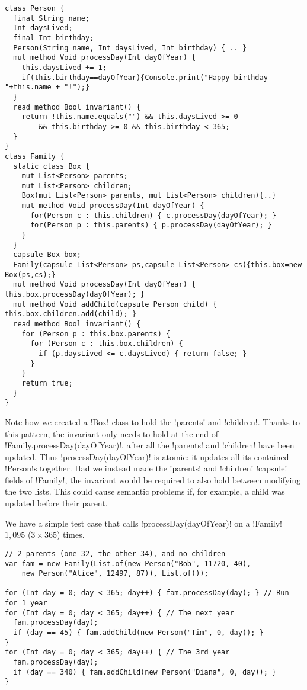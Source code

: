 \begin{lstlisting}
class Person { 
  final String name;
  Int daysLived;
  final Int birthday;
  Person(String name, Int daysLived, Int birthday) { .. }
  mut method Void processDay(Int dayOfYear) {
    this.daysLived += 1;
    if(this.birthday==dayOfYear){Console.print("Happy birthday "+this.name + "!");}
  }
  read method Bool invariant() {
    return !this.name.equals("") && this.daysLived >= 0 
        && this.birthday >= 0 && this.birthday < 365;
  }
}
class Family { 
  static class Box { 
    mut List<Person> parents;
    mut List<Person> children;
    Box(mut List<Person> parents, mut List<Person> children){..}
    mut method Void processDay(Int dayOfYear) {
      for(Person c : this.children) { c.processDay(dayOfYear); }
      for(Person p : this.parents) { p.processDay(dayOfYear); }
    }
  }
  capsule Box box;
  Family(capsule List<Person> ps,capsule List<Person> cs){this.box=new Box(ps,cs);}
  mut method Void processDay(Int dayOfYear) { this.box.processDay(dayOfYear); }
  mut method Void addChild(capsule Person child) { this.box.children.add(child); }
  read method Bool invariant() {
    for (Person p : this.box.parents) {
      for (Person c : this.box.children) {
        if (p.daysLived <= c.daysLived) { return false; }
      }
    }
    return true;
  }
}
\end{lstlisting}
Note how we created a \Q!Box! class to hold the \Q!parents! and \Q!children!.
Thanks to this pattern, the invariant only needs to hold at the end of \Q!Family.processDay(dayOfYear)!, after all the \Q!parents! and \Q!children! have been updated. Thus \Q!processDay(dayOfYear)! is atomic: it updates all its contained \Q!Person!s together.
Had we instead made the \Q!parents! and \Q!children! \Q!capsule! fields of \Q!Family!, the invariant would be required to also hold between modifying the two lists. This could cause semantic problems if, for example, a child was updated before their parent.

We have a simple test case that calls \Q!processDay(dayOfYear)! on a \Q!Family! $1{,}095$ ($3\times365$) times.
\begin{lstlisting}
// 2 parents (one 32, the other 34), and no children
var fam = new Family(List.of(new Person("Bob", 11720, 40),
    new Person("Alice", 12497, 87)), List.of());
    
for (Int day = 0; day < 365; day++) { fam.processDay(day); } // Run for 1 year
for (Int day = 0; day < 365; day++) { // The next year
  fam.processDay(day);
  if (day == 45) { fam.addChild(new Person("Tim", 0, day)); }
}
for (Int day = 0; day < 365; day++) { // The 3rd year
  fam.processDay(day);
  if (day == 340) { fam.addChild(new Person("Diana", 0, day)); }
}
\end{lstlisting}

